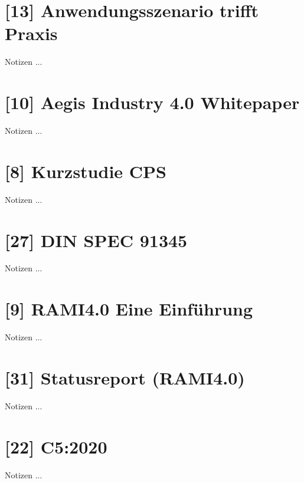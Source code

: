 \documentclass[a4paper,12pt]{report}
\begin{document}
\chapter{[13] Anwendungsszenario trifft Praxis}
Notizen ...


\label{13}


\chapter{[10] Aegis Industry 4.0 Whitepaper}
Notizen ...


\label{10}


\chapter{[8] Kurzstudie CPS}
Notizen ...


\label{8}


\chapter{[27] DIN SPEC 91345}
Notizen ...


\label{27}


\chapter{[9] RAMI4.0 Eine Einführung}
Notizen ...


\label{9}


\chapter{[31] Statusreport (RAMI4.0)}
Notizen ...


\label{31}


\chapter{[22] C5:2020}
Notizen ...


\label{22}
\end{document}
